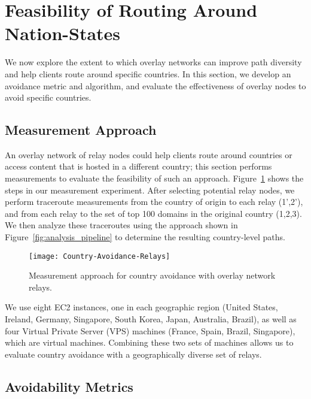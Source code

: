 \section{Feasibility of Routing Around Nation-States}
\label{avoid_results}

We now explore the extent to which overlay networks can improve path diversity and help clients 
route around specific countries.  In this section, we develop an avoidance metric and algorithm, and
evaluate the effectiveness of overlay nodes to avoid specific countries.

\subsection{Measurement Approach}
\label{avoid_pipelines}

An overlay network of relay nodes could
help clients route around countries or access content 
that is hosted in a different country; this section performs measurements to evaluate
the feasibility of such an approach. Figure~\ref{fig:avoidance_relays}
shows the steps in our measurement experiment.
After selecting potential relay nodes, we perform traceroute measurements from
the country of origin to each relay (1',2'), and from each relay to the set of top 100 domains
in the original country (1,2,3). We
then analyze these traceroutes using the approach shown in Figure~\ref{fig:analysis_pipeline}
to determine the resulting country-level paths. 

\begin{figure}[t]
\centering
\texttt{[image: Country-Avoidance-Relays]}
\caption{Measurement approach for country avoidance with overlay network relays.}
\label{fig:avoidance_relays}
\end{figure}

We use eight EC2 instances, one in each geographic region
(United States, Ireland, Germany, Singapore, South Korea, Japan, Australia,
Brazil), as well as four Virtual Private Server (VPS) machines (France,
Spain, Brazil, Singapore), which are virtual machines.
Combining these two sets of machines allows us to evaluate country avoidance with a geographically diverse set of relays. 

\subsection{Avoidability Metrics}
\label{metrics}


